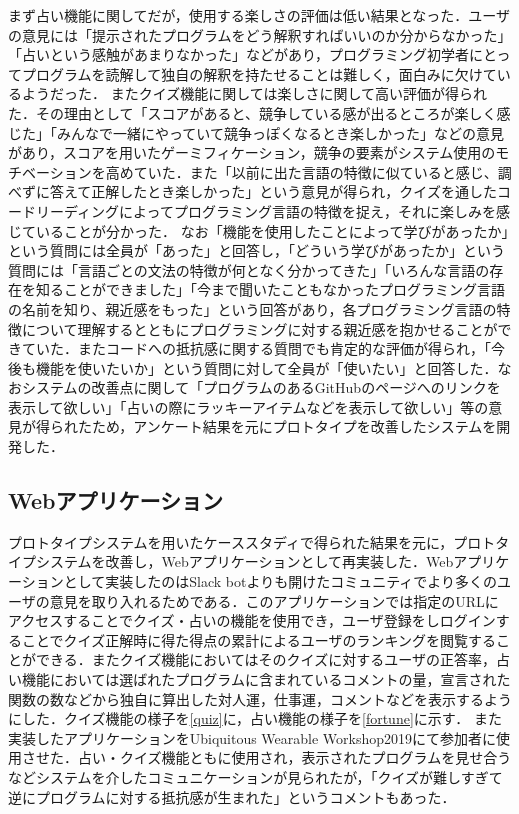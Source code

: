 まず占い機能に関してだが，使用する楽しさの評価は低い結果となった．ユーザの意見には「提示されたプログラムをどう解釈すればいいのか分からなかった」「占いという感触があまりなかった」などがあり，プログラミング初学者にとってプログラムを読解して独自の解釈を持たせることは難しく，面白みに欠けているようだった．
またクイズ機能に関しては楽しさに関して高い評価が得られた．その理由として「スコアがあると、競争している感が出るところが楽しく感じた」「みんなで一緒にやっていて競争っぽくなるとき楽しかった」などの意見があり，スコアを用いたゲーミフィケーション，競争の要素がシステム使用のモチベーションを高めていた．また「以前に出た言語の特徴に似ていると感じ、調べずに答えて正解したとき楽しかった」という意見が得られ，クイズを通したコードリーディングによってプログラミング言語の特徴を捉え，それに楽しみを感じていることが分かった．
なお「機能を使用したことによって学びがあったか」という質問には全員が「あった」と回答し，「どういう学びがあったか」という質問には「言語ごとの文法の特徴が何となく分かってきた」「いろんな言語の存在を知ることができました」「今まで聞いたこともなかったプログラミング言語の名前を知り、親近感をもった」という回答があり，各プログラミング言語の特徴について理解するとともにプログラミングに対する親近感を抱かせることができていた．またコードへの抵抗感に関する質問でも肯定的な評価が得られ，「今後も機能を使いたいか」という質問に対して全員が「使いたい」と回答した．なおシステムの改善点に関して「プログラムのあるGitHubのページへのリンクを表示して欲しい」「占いの際にラッキーアイテムなどを表示して欲しい」等の意見が得られたため，アンケート結果を元にプロトタイプを改善したシステムを開発した．

\subsection{Webアプリケーション}
プロトタイプシステムを用いたケーススタディで得られた結果を元に，プロトタイプシステムを改善し，Webアプリケーションとして再実装した．Webアプリケーションとして実装したのはSlack botよりも開けたコミュニティでより多くのユーザの意見を取り入れるためである．このアプリケーションでは指定のURLにアクセスすることでクイズ・占いの機能を使用でき，ユーザ登録をしログインすることでクイズ正解時に得た得点の累計によるユーザのランキングを閲覧することができる．またクイズ機能においてはそのクイズに対するユーザの正答率，占い機能においては選ばれたプログラムに含まれているコメントの量，宣言された関数の数などから独自に算出した対人運，仕事運，コメントなどを表示するようにした．クイズ機能の様子を\ref{quiz}に，占い機能の様子を\ref{fortune}に示す．
また実装したアプリケーションをUbiquitous Wearable Workshop2019にて参加者に使用させた．占い・クイズ機能ともに使用され，表示されたプログラムを見せ合うなどシステムを介したコミュニケーションが見られたが，「クイズが難しすぎて逆にプログラムに対する抵抗感が生まれた」というコメントもあった．

